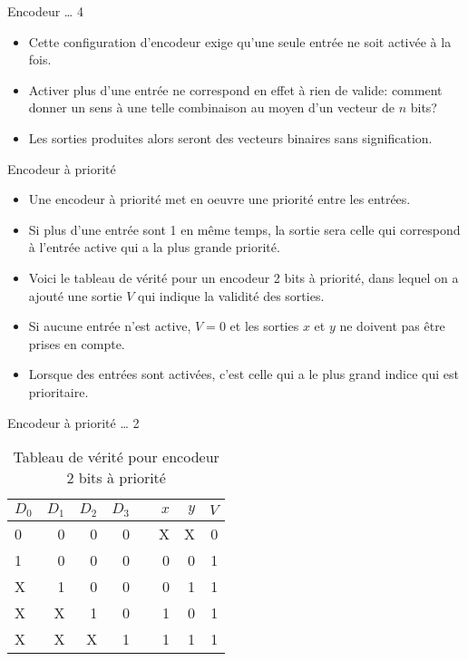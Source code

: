 \documentclass[presentation]{beamer}
\begin{document}
\begin{frame}[label={sec:orgfbccc19}]{Encodeur \ldots{} 4}
\begin{itemize}
\item Cette configuration d'encodeur exige qu'une seule entrée ne soit activée à la fois.

\item Activer plus d'une entrée ne correspond en effet à rien de valide: comment donner un sens à une telle combinaison au moyen d'un vecteur de \(n\) bits?

\item Les sorties produites alors seront des vecteurs binaires sans signification.
\end{itemize}
\end{frame}

\begin{frame}[label={sec:org3ce5acb}]{Encodeur à priorité}
\begin{itemize}
\item Une encodeur à priorité met en oeuvre une priorité entre les entrées.

\item Si plus d'une entrée sont 1 en même temps, la sortie sera celle qui correspond à l'entrée active qui a la plus grande priorité.

\item Voici le tableau de vérité pour un encodeur 2 bits à priorité, dans lequel on a ajouté une sortie \(V\) qui indique la validité des sorties.

\item Si aucune entrée n'est active, \(V=0\) et les sorties \(x\) et \(y\) ne doivent pas être prises en compte.

\item Lorsque des entrées sont activées, c'est celle qui a le plus grand indice qui est prioritaire.
\end{itemize}
\end{frame}

\begin{frame}[label={sec:org1b34c37}]{Encodeur à priorité \ldots{} 2}
\begin{table}[htbp]
\caption{\label{tab:orgeaf12cd}Tableau de vérité pour encodeur 2 bits à priorité}
\centering
\begin{tabular}{lrrrlrrr}
\(D_0\) & \(D_1\) & \(D_2\) & \(D_3\) &  & \(x\) & \(y\) & \(V\)\\
\hline
0 & 0 & 0 & 0 &  & X & X & 0\\
1 & 0 & 0 & 0 &  & 0 & 0 & 1\\
X & 1 & 0 & 0 &  & 0 & 1 & 1\\
X & X & 1 & 0 &  & 1 & 0 & 1\\
X & X & X & 1 &  & 1 & 1 & 1\\
\end{tabular}
\end{table}
\end{frame}
\end{document}
